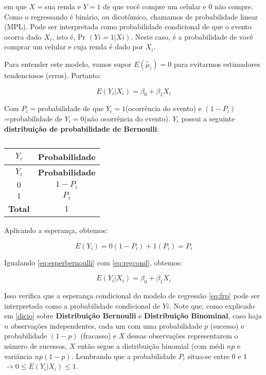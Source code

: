 \documentclass[
]{book}
\begin{document}
em que \(X =\)sua renda e \(Y=1\) de que você compre um celular e \(0\) não compre. Como o regressando é binário, ou dicotômico, chamamos de probabilidade linear (MPL). Pode ser interpretada como probabilidade condicional de que o evento ocorra dado \(X_i\), isto é, Pr \((Yi = 1 | Xi)\). Neste caso, é a probabilidade de você comprar um celular e cuja renda é dado por \(X_i\).

Para entender este modelo, vamos supor \(E(\hat{\mu}_i)=0\) para evitarmos estimadores tendenciosos (erros). Portanto:

\begin{equation}
    E(Y_i|X_i)=\beta_0+\beta_1 X_i
    \label{eq:regcond}
\end{equation}

Com \(P_i=\)probabilidade de que \(Y_i=1\)(ocorrência do evento) e \((1-P_i)\)=probabilidade de \(Y_i=0\)(não ocorrência do evento). \(Y_i\) possui a seguinte \textbf{distribuição de probabilidade de Bernoulli}:

\begin{longtable}[]{@{}cc@{}}
\caption{\label{tab:bernoulireg}}\tabularnewline
\toprule
\textbf{\(Y_i\)} & \textbf{Probabilidade}\tabularnewline
\midrule
\endfirsthead
\toprule
\textbf{\(Y_i\)} & \textbf{Probabilidade}\tabularnewline
\midrule
\endhead
\(0\) & \(1-P_i\)\tabularnewline
\(1\) & \(P_i\)\tabularnewline
\textbf{Total} & \(1\)\tabularnewline
\bottomrule
\end{longtable}

Aplicando a esperança, obtemos:

\begin{equation}
    E(Y_i)=0(1-P_i)+1(P_i)=P_i
    \label{eq:esperbernoulli}
\end{equation}

Igualando \eqref{eq:esperbernoulli} com \eqref{eq:regcond}, obtemos:

\begin{equation}
    E(Y_i|X_i)=\beta_0+\beta_1 X_i
    \label{eq:regprob}
\end{equation}

Isso verifica que a esperança condicional do modelo de regressão \eqref{eq:frp} pode ser interpretada como a probabilidade
condicional de \(Yi\). Note que, como explicado em \ref{dicio} sobre \textbf{Distribuição Bernoulli} e \textbf{Distribuição Binominal}, caso haja \(n\) observações independentes, cada um com uma probabilidade \(p\) (sucesso) e probabilidade \((1 - p)\) (fracasso) e \(X\) dessas observações representarem o número de sucessos, \(X\) então segue a distribuição binomial (com médi \(np\) e variância \(np(1-p)\). Lembrando que a probabilidade \(P_i\) situa-se entre 0 e 1 \(\rightarrow 0 \leq E(Y_i|X_i) \leq 1\).
\end{document}
